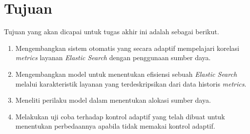 \section{Tujuan}

Tujuan yang akan dicapai untuk tugas akhir ini adalah sebagai berikut.

\begin{enumerate}
    \item Mengembangkan sistem otomatis yang secara adaptif mempelajari korelasi \textit{metrics} layanan \textit{Elastic Search} dengan penggunaan sumber daya.
    \item Mengembangkan model untuk menentukan efisiensi sebuah \textit{Elastic Search} melalui karakteristik layanan yang terdeskripsikan dari data historis \textit{metrics}.
    \item Meneliti perilaku model dalam menentukan alokasi sumber daya.
    \item Melakukan uji coba terhadap kontrol adaptif yang telah dibuat untuk menentukan perbedaannya apabila tidak memakai kontrol adaptif.
\end{enumerate}